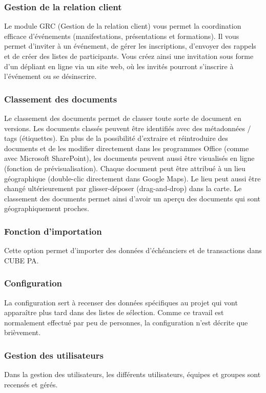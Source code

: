 \subsubsection{Gestion de la relation client}

Le module GRC (Gestion de la relation client) vous permet la coordination efficace d’événements (manifestations, présentations et formations). Il vous permet d'inviter à un événement, de gérer les inscriptions, d'envoyer des rappels et de créer des listes de participants. Vous créez ainsi une invitation sous forme d'un dépliant en ligne via un site web, où les invités pourront s'inscrire à l'événement ou se désinscrire.

\subsubsection{Classement des documents}

Le classement des documents permet de classer toute sorte de document en versions. Les documents classés peuvent être identifiés avec des métadonnées / tags (étiquettes). En plus de la possibilité d'extraire et réintroduire des documents et de les modifier directement dans les programmes Office (comme avec Microsoft SharePoint), les documents peuvent aussi être visualisés en ligne (fonction de prévisualisation). Chaque document peut être attribué à un lieu géographique (double-clic directement dans Google Maps). Le lieu peut aussi être changé ultérieurement par glisser-déposer (drag-and-drop) dans la carte. Le classement des documents permet ainsi d'avoir un aperçu des documents qui sont géographiquement proches.

\subsubsection{Fonction d'importation}

Cette option permet d'importer des données d'échéanciers et de transactions dans CUBE PA.

\subsubsection{Configuration}

La configuration sert à recenser des données spécifiques au projet qui vont apparaître plus tard dans des listes de sélection. Comme ce travail est normalement effectué par peu de personnes, la configuration n'est décrite que brièvement.

\subsubsection{Gestion des utilisateurs}

Dans la gestion des utilisateurs, les différents utilisateurs, équipes et groupes sont recensés et gérés.
